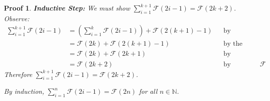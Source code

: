 \documentclass[12pt]{article}
\newcommand{\N}{\mathbb{N}}
\theoremstyle{proofstyle}
\newtheorem*{proof*}{Proof}
\begin{document}
\begin{enumerate}[left=0pt, itemsep=2em, parsep=1em]
\begin{proof*}
\textbf{Inductive Step:} We must show $\displaystyle\sum_{i=1}^{k+1} \mathcal{F}(2i-1) = \mathcal{F}(2k+2)$. Observe:
\begin{align*}
  \sum_{i=1}^{k+1} \mathcal{F}(2i-1)
    &= \left(\sum_{i=1}^{k} \mathcal{F}(2i-1)\right) + \mathcal{F}(2(k+1)-1)
      &&\text{by definition of iterated summation} \\
    &= \mathcal{F}(2k) + \mathcal{F}(2(k+1)-1)
      &&\text{by the inductive hypothesis} \\
    &= \mathcal{F}(2k) + \mathcal{F}(2k+1)
      &&\text{by arithmetic} \\
    &= \mathcal{F}(2k+2)
      &&\text{by definition of }\mathcal{F}
\end{align*}
Therefore $\displaystyle\sum_{i=1}^{k+1} \mathcal{F}(2i-1) = \mathcal{F}(2k+2)$.

By induction, $\displaystyle\sum_{i=1}^{n} \mathcal{F}(2i-1) = \mathcal{F}(2n)$ for all $n \in \N$.
\end{proof*}

\end{enumerate}
\end{document}
